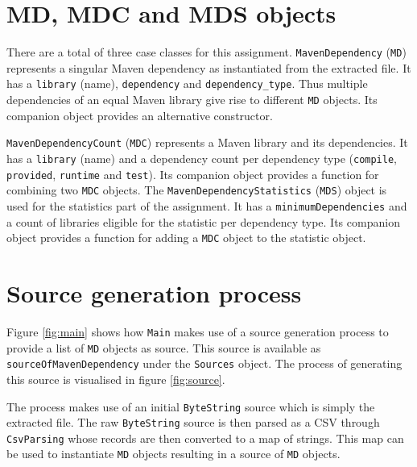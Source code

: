 
\section{MD, MDC and MDS objects}
\label{sec:MD_vs_MDC_vs_MDS}

There are a total of three case classes for this assignment.
\texttt{MavenDependency} (\texttt{MD}) represents a singular Maven dependency as instantiated from the extracted file.
It has a \texttt{library} (name), \texttt{dependency} and \texttt{dependency\_type}. 
Thus multiple dependencies of an equal Maven library give rise to different \texttt{MD} objects.
Its companion object provides an alternative constructor.

\texttt{MavenDependencyCount} (\texttt{MDC}) represents a Maven library and its dependencies.
It has a \texttt{library} (name) and a dependency count per dependency type (\texttt{compile}, \texttt{provided}, \texttt{runtime} and \texttt{test}).
Its companion object provides a function for combining two \texttt{MDC} objects.
The \texttt{MavenDependencyStatistics} (\texttt{MDS}) object is used for the statistics part of the assignment.
It has a \texttt{minimumDependencies} and a count of libraries eligible for the statistic per dependency type.
Its companion object provides a function for adding a \texttt{MDC} object to the statistic object.



\section{Source generation process}
\label{sec:source_gen_proc}

Figure \ref{fig:main} shows how \texttt{Main} makes use of a source generation process to provide a list of \texttt{MD} objects as source.
This source is available as \texttt{sourceOfMavenDependency} under the \texttt{Sources} object.
The process of generating this source is visualised in figure \ref{fig:source}.

The process makes use of an initial \texttt{ByteString} source which is simply the extracted file.
The raw \texttt{ByteString} source is then parsed as a CSV through \texttt{CsvParsing} whose records are then converted to a map of strings.
This map can be used to instantiate \texttt{MD} objects resulting in a source of \texttt{MD} objects.

